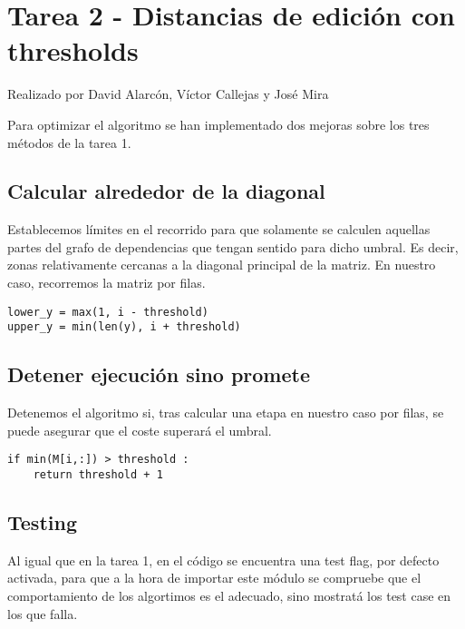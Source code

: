 \section{Tarea 2 - Distancias de edición con thresholds}
{\color{red}Realizado por David Alarcón, Víctor Callejas y José Mira}

Para optimizar el algoritmo se han implementado dos mejoras sobre los tres métodos de la tarea 1.
\subsection{Calcular alrededor de la diagonal}
Establecemos límites en el recorrido para que solamente se calculen aquellas partes del grafo de dependencias que tengan sentido para dicho umbral.
Es decir, zonas relativamente cercanas a la diagonal principal de la matriz. En nuestro caso, recorremos la matriz por filas.
        

\begin{lstlisting}[caption=Calculo de los umbrales]
lower_y = max(1, i - threshold)
upper_y = min(len(y), i + threshold)
\end{lstlisting}

\subsection{Detener ejecución sino promete}
Detenemos el algoritmo si, tras calcular una etapa en nuestro caso por filas, se puede asegurar que el coste superará el umbral.

\begin{lstlisting}[caption=Parar ejecución sino promete]
if min(M[i,:]) > threshold :
    return threshold + 1
\end{lstlisting}


\subsection{Testing}


Al igual que en la tarea 1, en el código se encuentra una test flag, por defecto activada, para que a la hora de importar este módulo se compruebe que el comportamiento de los algortimos es el adecuado, sino mostratá los test case en los que falla.

\newpage